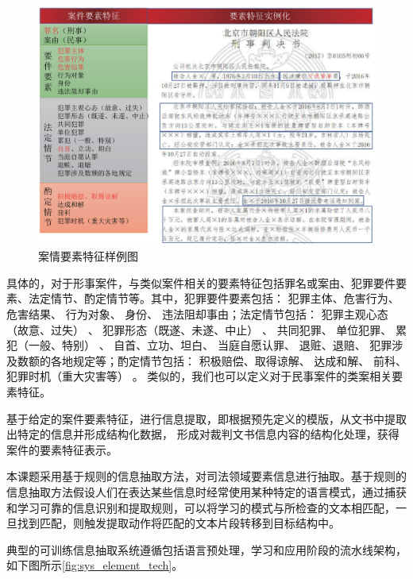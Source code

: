 \begin{figure}[htbp]%
    \centering
    \includegraphics[scale=0.5, clip=true]{./sources/sys_element_demo.eps}
    \caption{\label{fig:sys_element_demo}案情要素特征样例图}
\end{figure}

具体的，对于形事案件，与类似案件相关的要素特征包括罪名或案由、犯罪要件要素、法定情节、酌定情节等。其中，犯罪要件要素包括： 犯罪主体、危害行为、 危害结果、 行为对象、 身份、 违法阻却事由；法定情节包括： 犯罪主观心态（故意、过失） 、 犯罪形态（既遂、未遂、中止） 、 共同犯罪、 单位犯罪、 累犯（一般、特别） 、 自首、立功、坦白、 当庭自愿认罪、 退赃、退赔、 犯罪涉及数额的各地规定等；酌定情节包括： 积极赔偿、取得谅解、 达成和解、 前科、 犯罪时机（重大灾害等） 。 类似的，我们也可以定义对于民事案件的类案相关要素特征。

基于给定的案件要素特征，进行信息提取，即根据预先定义的模版，从文书中提取出特定的信息并形成结构化数据， 形成对裁判文书信息内容的结构化处理，获得案件的要素特征表示。

本课题采用基于规则的信息抽取方法，对司法领域要素信息进行抽取。基于规则的信息抽取方法假设人们在表达某些信息时经常使用某种特定的语言模式，通过捕获和学习可靠的信息识别和提取规则，可以将学习的模式与所检查的文本相匹配，一旦找到匹配，则触发提取动作将匹配的文本片段转移到目标结构中。

典型的可训练信息抽取系统遵循包括语言预处理，学习和应用阶段的流水线架构，如下图所示\ref{fig:sys_element_tech}。

